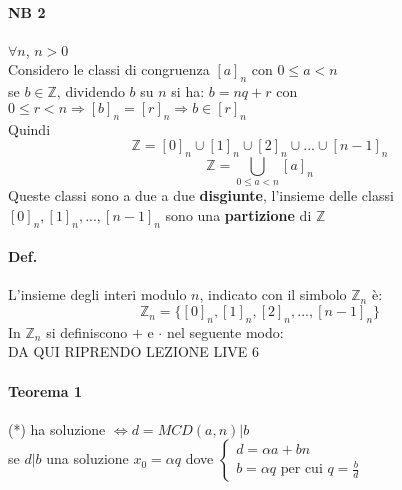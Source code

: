 \paragraph{NB 2} $\forall n$, $n>0$\\
Considero le classi di congruenza $[a]_n$ con $0\leq a<n$\\
se $b\in\mathbb{Z}$, dividendo $b$ su $n$ si ha: $b=nq+r$ con $0\leq r<n
\Longrightarrow [b]_n=[r]_n\Longrightarrow b\in[r]_n$\\ Quindi 
$$\mathbb{Z}=[0]_n\cup[1]_n\cup[2]_n\cup...\cup [n-1]_n$$
$$\mathbb{Z}=\underset{0\leq a <n}{\bigcup} [a]_n$$
Queste classi sono a due a due \textbf{disgiunte}, l'insieme delle classi 
$[0]_n,[1]_n,...,[n-1]_n$ sono una \textbf{partizione} di $\mathbb{Z}$
\paragraph{Def.} L'insieme degli {\color{red} interi modulo $n$}, indicato con il simbolo
$\mathbb{Z}_n$ è:\\
$$\mathbb{Z}_n=\Big\{ [0]_n,[1]_n,[2]_n,...,[n-1]_n \Big\}$$
In $\mathbb{Z}_n$ si definiscono $+$ e $\cdot$ nel seguente modo:\\

DA QUI RIPRENDO LEZIONE LIVE 6    

\paragraph{Teorema 1} (*) ha soluzione $\Longleftrightarrow d=MCD(a,n)|b$\\
se $d|b$ una soluzione $x_0=\alpha q$ dove $
\begin{cases}
    d=\alpha a+bn\\
    b=\alpha q\textrm{ per cui }q=\frac{b}{d}
\end{cases}
$
